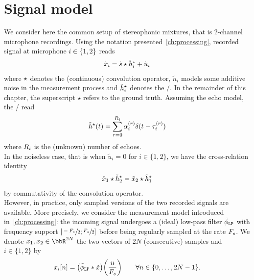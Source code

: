 \section{Signal model}
We consider here the common setup of stereophonic mixtures, that is 2-channel microphone recordings.
Using the notation presented~\cref{ch:processing}, recorded signal at microphone $i\in\{1,2\}$ reads
\begin{equation}
    \label{eq:blaster:recordedSignal}
    \tilde{x}_i = \tilde{s} \star \tilde{h}_i^\star + \tilde{u}_i
\end{equation}
where $\star$ denotes the (continuous) convolution operator, $\tilde{n}_i$ models some additive noise in the measurement process and $\tilde{h}_i^\star$ denotes the \RIRdef/.
In the remainder of this chapter, the superscript $\star$ refers to the ground truth.
Assuming the echo model, the \RIRs/ read
\begin{equation}
    \label{eq:blaster:def_filter_star}
    \tilde{h}^\star(t) = \sum_{r=0}^{R_i} \alpha_i^{(r)} \delta(t - \tau_i^{(r)})
\end{equation}
where $R_i$ is the (unknown) number of echoes.
\\In the noiseless case, that is when $\tilde{u}_i = 0$ for $i\in\{1,2\}$, we have the cross-relation identity
\begin{equation} \label{eq:blaster:cross-relation}
    \tilde{x}_1 \star \tilde{h}_2^\star = \tilde{x}_2 \star \tilde{h}_1^\star
\end{equation}
by commutativity of the convolution operator.
\\However, in practice, only sampled versions of the two recorded signals are available.
More precisely, we consider the measurement model introduced in~\cref{ch:processing}:
the incoming signal undergoes a (ideal) low-pass filter $\lowpassfilter$ with frequency support $\kintervcc{\sfrac{-\Fs}{2}}{\sfrac{\Fs}{2}}$ before being regularly sampled at the rate $F_s$.
We denote $\disRecordedSignal_1,\disRecordedSignal_2\in\bbR^{2N}$ the two vectors of $2N$ (consecutive) samples and $i\in\{1, 2\}$ by
\begin{equation}
    \label{eq:blaster:measurement-process}
    \disRecordedSignal_i[n] =
    \kparen{\idealLowPassFilter \convDis \contRecordedSignal}\kparen{\frac{n}{\Fs}}
    \qquad
    \forall n \in\{0, \dots, 2N-1\}
    .
\end{equation}

